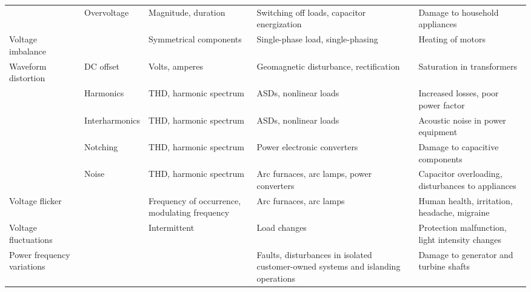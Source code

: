\begin{adjustbox}{center}
\begin{table}[]
\begin{tabular}{lllll}
                                 & Overvoltage            & Magnitude, duration                           & Switching off loads, capacitor energization                                      & Damage to household appliances                    \\
Voltage imbalance                &                        & Symmetrical components                        & Single-phase load, single-phasing                                                & Heating of motors                                 \\
Waveform distortion              & DC offset              & Volts, amperes                                & Geomagnetic disturbance, rectification                                           & Saturation in transformers                        \\
                                 & Harmonics              & THD, harmonic spectrum                        & ASDs, nonlinear loads                                                            & Increased losses, poor power factor               \\
                                 & Interharmonics         & THD, harmonic spectrum                        & ASDs, nonlinear loads                                                            & Acoustic noise in power equipment                 \\
                                 & Notching               & THD, harmonic spectrum                        & Power electronic converters                                                      & Damage to capacitive components                   \\
                                 & Noise                  & THD, harmonic spectrum                        & Arc furnaces, arc lamps, power converters                                        & Capacitor overloading, disturbances to appliances \\
Voltage flicker                  &                        & Frequency of occurrence, modulating frequency & Arc furnaces, arc lamps                                                          & Human health, irritation, headache, migraine      \\
Voltage fluctuations             &                        & Intermittent                                  & Load changes                                                                     & Protection malfunction, light intensity changes   \\
Power frequency variations       &                        &                                               & Faults, disturbances in isolated customer-owned systems and islanding operations & Damage to generator and turbine shafts            \\ \hline
\end{tabular}
\end{table}
\end{adjustbox}